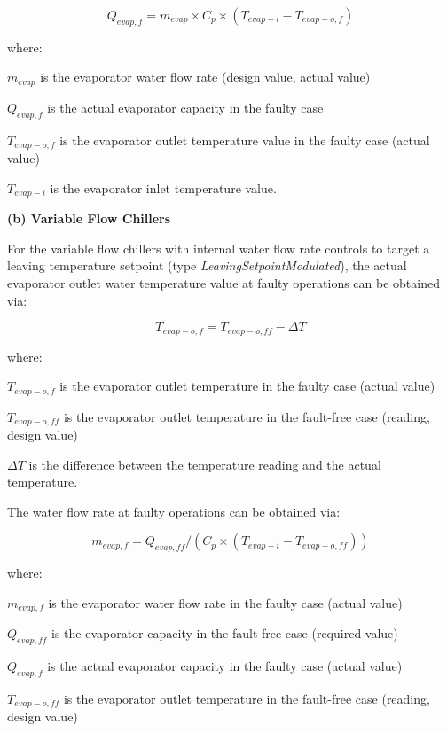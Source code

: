 \begin{equation}
Q_{evap,f} = m_{evap} \times C_p \times (T_{evap-i} - T_{evap-o,f} )
\end{equation}

where:

\(m_{evap}\) is the evaporator water flow rate (design value, actual value)

\(Q_{evap,f}\) is the actual evaporator capacity in the faulty case

\(T_{evap-o,f}\) is the evaporator outlet temperature value in the faulty case (actual value)

\(T_{evap-i}\) is the evaporator inlet temperature value. \newline

\textbf{(b) Variable Flow Chillers}

For the variable flow chillers with internal water flow rate controls to target a leaving temperature setpoint (type \emph{LeavingSetpointModulated}), the actual evaporator outlet water temperature value at faulty operations can be obtained via:

\begin{equation}
T_{evap-o,f} = T_{evap-o,ff} - \Delta T
\end{equation}

where:

\(T_{evap-o,f}\) is the evaporator outlet temperature in the faulty case (actual value)

\(T_{evap-o,ff}\) is the evaporator outlet temperature in the fault-free case (reading, design value)

\(\Delta T\) is the difference between the temperature reading and the actual temperature.

The water flow rate at faulty operations can be obtained via:

\begin{equation}
m_{evap,f} = Q_{evap,ff} / ( C_p \times (T_{evap-i} - T_{evap-o,ff} ) )
\end{equation}

where:

\(m_{evap,f}\) is the evaporator water flow rate in the faulty case (actual value)

\(Q_{evap,ff}\) is the evaporator capacity in the fault-free case (required value)

\(Q_{evap,f}\) is the actual evaporator capacity in the faulty case (actual value)

\(T_{evap-o,ff}\) is the evaporator outlet temperature in the fault-free case (reading, design value)

